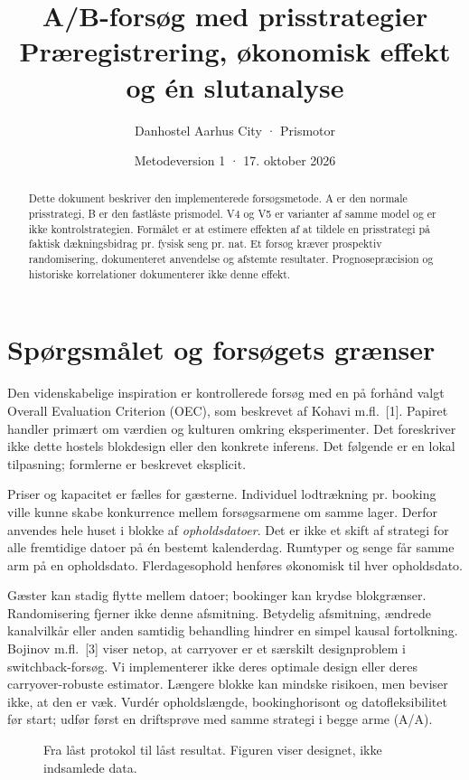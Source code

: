 \documentclass[11pt,a4paper]{article}
\title{A/B-forsøg med prisstrategier\\\large Præregistrering, økonomisk effekt og én slutanalyse}
\author{Danhostel Aarhus City · Prismotor}
\date{Metodeversion 1 · 17. oktober 2026}
\begin{document}
\maketitle
\begin{abstract}
Dette dokument beskriver den implementerede forsøgsmetode. A er den normale
prisstrategi, B er den fastlåste prismodel. V4 og V5 er varianter af samme model og er ikke
kontrolstrategien. Formålet er at estimere effekten af at tildele en prisstrategi på
faktisk dækningsbidrag pr. fysisk seng pr. nat. Et forsøg kræver prospektiv
randomisering, dokumenteret anvendelse og afstemte resultater. Prognosepræcision
og historiske korrelationer dokumenterer ikke denne effekt.
\end{abstract}
\tableofcontents
\newpage
\section{Spørgsmålet og forsøgets grænser}
Den videnskabelige inspiration er kontrollerede forsøg med en på forhånd valgt
Overall Evaluation Criterion (OEC), som beskrevet af Kohavi m.fl.\ [1]. Papiret
handler primært om værdien og kulturen omkring eksperimenter. Det foreskriver
ikke dette hostels blokdesign eller den konkrete inferens. Det følgende er en
lokal tilpasning; formlerne er beskrevet eksplicit.

Priser og kapacitet er fælles for gæsterne. Individuel lodtrækning pr. booking ville
kunne skabe konkurrence mellem forsøgsarmene om samme lager. Derfor anvendes
hele huset i blokke af \emph{opholdsdatoer}. Det er ikke et skift af strategi for alle
fremtidige datoer på én bestemt kalenderdag. Rumtyper og senge får samme arm på
en opholdsdato. Flerdagesophold henføres økonomisk til hver opholdsdato.

Gæster kan stadig flytte mellem datoer; bookinger kan krydse blokgrænser.
Randomisering fjerner ikke denne afsmitning. Betydelig afsmitning, ændrede
kanalvilkår eller anden samtidig behandling hindrer en simpel kausal fortolkning.
Bojinov m.fl.\ [3] viser netop, at carryover er et særskilt designproblem i
switchback-forsøg. Vi implementerer ikke deres optimale design eller deres
carryover-robuste estimator. Længere blokke kan mindske risikoen, men beviser
ikke, at den er væk. Vurdér opholdslængde, bookinghorisont og datofleksibilitet
før start; udfør først en driftsprøve med samme strategi i begge arme (A/A).

\begin{figure}[ht]
\centering\resizebox{.95\linewidth}{!}{}
\caption{Fra låst protokol til låst resultat. Figuren viser designet, ikke indsamlede data.}
\end{figure}
\clearpage
\end{document}
